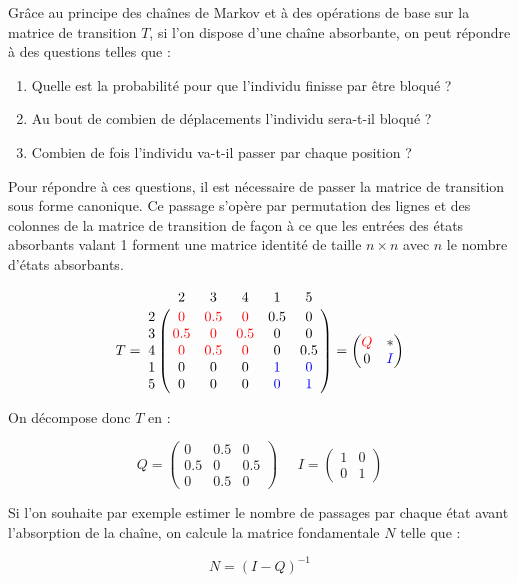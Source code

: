 \documentclass[12pt]{article}
\begin{document}
Grâce au principe des chaînes de Markov et à des opérations de base
sur la matrice de transition $T$, si l'on dispose d'une chaîne
absorbante, on peut répondre à des questions telles que :

\begin{enumerate}
  \item{Quelle est la probabilité pour que l'individu finisse par être
    bloqué ?}
  \item{Au bout de combien de déplacements l'individu sera-t-il
    bloqué ?}
  \item{Combien de fois l'individu va-t-il passer par chaque position ?}
\end{enumerate}

Pour répondre à ces questions, il est nécessaire de passer la matrice
de transition sous forme canonique. Ce passage s'opère par permutation
des lignes et des colonnes de la matrice de transition de façon à ce
que les entrées des états absorbants valant 1 forment une matrice
identité de taille $n \times n$ avec $n$ le nombre d'états absorbants.

$$
T = \bordermatrix{
    & 2 & 3 & 4 & 1 & 5 \cr
  2 & \color{red}0 & \color{red}0.5 & \color{red}0 & 0.5 & 0 \cr
  3 & \color{red}0.5 & \color{red}0 & \color{red}0.5 & 0 & 0 \cr
  4 & \color{red}0 & \color{red}0.5 & \color{red}0 & 0 & 0.5 \cr
  1 & 0 & 0 & 0 & \color{blue}1 & \color{blue}0 \cr
  5 & 0 & 0 & 0 & \color{blue}0 & \color{blue}1 \cr
}
=
\begin{pmatrix}
  \color{red}Q & * \\
  0 & \color{blue}I
\end{pmatrix}
$$
\vspace{0.5cm}

On décompose donc $T$ en :

$$
Q =
\begin{pmatrix}
  0 & 0.5 & 0 \\
  0.5 & 0 & 0.5 \\
  0 & 0.5 & 0
\end{pmatrix}
\;\;\;\;\;
I =
\begin{pmatrix}
  1 & 0 \\
  0 & 1
\end{pmatrix}
$$
\vspace{0.5cm}

Si l'on souhaite par exemple estimer le nombre de passages par chaque
état avant l'absorption de la chaîne, on calcule la matrice
fondamentale $N$ telle que :

$$
N = (I - Q)^{-1}
$$
\end{document}
